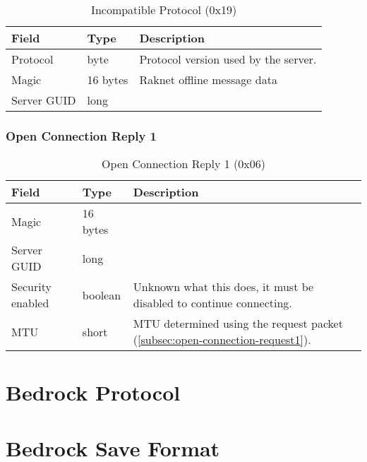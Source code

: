\documentclass[12pt]{report}
\newcommand{\packet}[3]{
    \begin{table}[H]
        \label{tab:#1}
        \caption{#2}
        \vspace{0.25cm}
        \begin{tabularx}{\textwidth}{|l|l|X|}
            \hline
            \rowcolor{yellow}
            Field & Type & Description \\
            \hline
            #3
            \hline
        \end{tabularx}
    \end{table}
}
\begin{document}
\packet{incompatible-protocol}{Incompatible Protocol (0x19)}{
    Protocol & byte & Protocol version used by the server. \\
    \hline
    Magic & 16 bytes & Raknet offline message data \\
    \hline
    Server GUID & long & \\
}

\subsection{Open Connection Reply 1}\label{subsec:open-connection-reply1}

\packet{open-connection-reply1}{Open Connection Reply 1 (0x06)}{
    Magic & 16 bytes & \\
    \hline
    Server GUID & long & \\
    \hline
    Security enabled & boolean & Unknown what this does, it must be disabled to continue connecting. \\
    \hline
    MTU & short & MTU determined using the request packet (\ref{subsec:open-connection-request1}). \\
}

\chapter{Bedrock Protocol}

\chapter{Bedrock Save Format}
\end{document}
